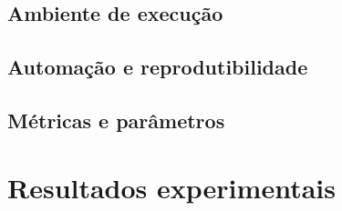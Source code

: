 \subsection{Ambiente de execução}

\subsection{Automação e reprodutibilidade}

\subsection{Métricas e parâmetros}

\section{Resultados experimentais}


